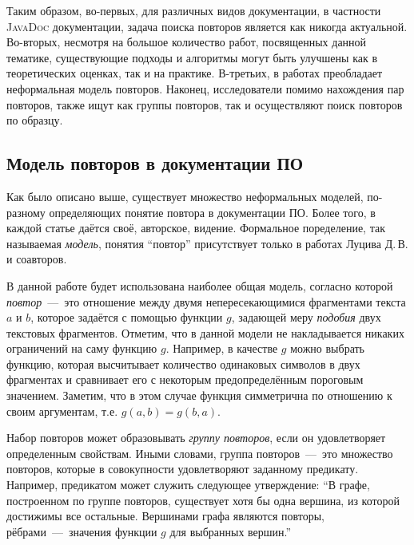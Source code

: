 Таким образом, во-первых, для различных видов документации, в частности \textsc{JavaDoc} документации, задача поиска повторов является как никогда актуальной.
Во-вторых, несмотря на большое количество работ, посвященных  данной тематике, существующие подходы и алгоритмы могут быть улучшены как в теоретических оценках, так и на практике.
В-третьих, в работах преобладает неформальная модель повторов.
Наконец, исследователи помимо нахождения пар повторов, также ищут как группы повторов, так и осуществляют поиск повторов по образцу.


\subsection{Модель повторов в документации ПО}\label{Model}
Как было описано выше, существует множество неформальных моделей, по-разному определяющих понятие повтора в документации ПО.
Более того, в каждой статье даётся своё, авторское, видение.
Формальное поределение, так называемая \emph{модель}, понятия ``повтор'' присутствует только в работах Луцива Д.\,В. и соавторов.

В данной работе будет использована наиболее общая модель, согласно которой \emph{повтор}~---~это отношение между двумя непересекающимися фрагментами текста $a$ и $b$, которое задаётся с помощью функции $g$, задающей меру \emph{подобия} двух текстовых фрагментов.
Отметим, что в данной модели не накладывается никаких ограничений на саму функцию $g$.
Например, в качестве $g$ можно выбрать функцию, которая высчитывает количество одинаковых символов в двух фрагментах и сравнивает его с некоторым предопределённым пороговым значением. %
Заметим, что в этом случае функция симметрична по отношению к своим аргументам, т.е. $g(a,b) = g(b,a)$.


Набор повторов может образовывать \emph{группу повторов}, если он удовлетворяет определенным свойствам. Иными словами, группа повторов~---~это множество повторов, которые в совокупности удовлетворяют заданному предикату.
Например, предикатом может служить следующее утверждение: ``В графе, построенном по группе повторов, существует хотя бы одна вершина, из которой достижимы все остальные.
Вершинами графа являются повторы, рёбрами~---~значения функции $g$ для выбранных вершин.''


